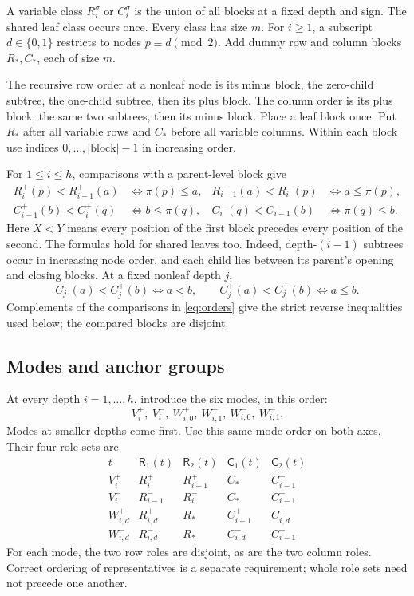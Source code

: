 \documentclass[11pt,a4paper]{article}
\theoremstyle{remark}
\newcommand{\Rrole}{\mathsf R}
\newcommand{\Crole}{\mathsf C}
\begin{document}
A variable class \(R_i^\sigma\) or \(C_i^\sigma\) is the union of
all blocks at a fixed depth and sign. The shared leaf class occurs once.
Every class has size \(m\). For \(i\ge1\), a subscript \(d\in\{0,1\}\)
restricts to nodes \(p\equiv d\pmod2\). Add dummy row and column blocks
\(R_*,C_*\), each of size \(m\).

The recursive row order at a nonleaf node is its minus block, the
zero-child subtree, the one-child subtree, then its plus block.
The column order is its plus block, the same two subtrees, then its
minus block. Place a leaf block once. Put \(R_*\) after all variable
rows and \(C_*\) before all variable columns. Within each block use
indices \(0,\ldots,\lvert\text{block}\rvert-1\) in increasing order.

For \(1\le i\le h\), comparisons with a parent-level block give
\begin{equation}\label{eq:orders}
\begin{aligned}
R_i^+(p)<R_{i-1}^+(a)&\iff\pi(p)\le a,&
R_{i-1}^-(a)<R_i^-(p)&\iff a\le\pi(p),\\
C_{i-1}^+(b)<C_i^+(q)&\iff b\le\pi(q),&
C_i^-(q)<C_{i-1}^-(b)&\iff\pi(q)\le b.
\end{aligned}
\end{equation}
Here \(X<Y\) means every position of the first block precedes every
position of the second. The formulas hold for shared leaves too.
Indeed, depth-\((i-1)\) subtrees occur in increasing node order, and
each child lies between its parent's opening and closing blocks.
At a fixed nonleaf depth \(j\),
\begin{equation}\label{eq:same-level}
C_j^-(a)<C_j^+(b)\iff a<b,\qquad
C_j^+(a)<C_j^-(b)\iff a\le b.
\end{equation}
Complements of the comparisons in \eqref{eq:orders} give the strict
reverse inequalities used below; the compared blocks are disjoint.

\subsection{Modes and anchor groups}
At every depth \(i=1,\ldots,h\), introduce the six modes, in this order:
\[
V_i^+,\ V_i^-,\ W_{i,0}^+,\ W_{i,1}^+,\ W_{i,0}^-,\ W_{i,1}^-.
\]
Modes at smaller depths come first. Use this same mode order on both
axes. Their four role sets are
\begin{equation}\label{eq:roles}
\begin{array}{c|cc|cc}
t&\Rrole_1(t)&\Rrole_2(t)&\Crole_1(t)&\Crole_2(t)\\ \hline
V_i^+&R_i^+&R_{i-1}^+&C_*&C_{i-1}^+\\
V_i^-&R_{i-1}^-&R_i^-&C_*&C_{i-1}^-\\
W_{i,d}^+&R_{i,d}^+&R_*&C_{i-1}^+&C_{i,d}^+\\
W_{i,d}^-&R_{i,d}^-&R_*&C_{i,d}^-&C_{i-1}^-
\end{array}
\end{equation}
For each mode, the two row roles are disjoint, as are the two column
roles. Correct ordering of representatives is a separate requirement;
whole role sets need not precede one another.
\end{document}
